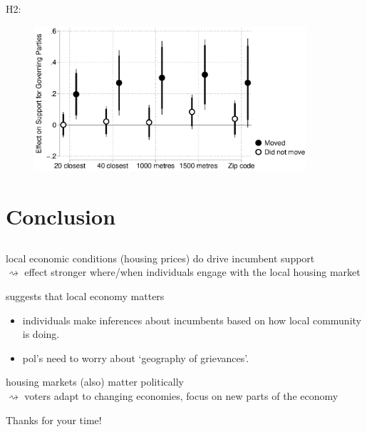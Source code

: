 \documentclass[10pt,aspectratio=169]{beamer}
\begin{document}

\begin{frame}
H2: \\ 
\centering
\begin{figure}[htbp!]
	\includegraphics[width=0.9\textwidth]{../../figures/moving.eps}
\end{figure}
\end{frame}



\section{Conclusion}
\subsection{}
\begin{frame}
local economic conditions (housing prices) do drive incumbent support \\ \pause
$\rightsquigarrow$ effect stronger where/when individuals engage with the local housing market \pause

\vspace{0.2in}
suggests that local economy matters \pause
\begin{itemize}[<+->]
\item individuals make inferences about incumbents based on how local community is doing.
\item pol's need to worry about `geography of grievances'.
\end{itemize}

\vspace{0.2in} \pause
housing markets (also) matter politically \\ \pause
$\rightsquigarrow$ voters adapt to changing economies, focus on new parts of the economy
\end{frame}

\begin{frame}
\centering
Thanks for your time!
\end{frame}

\appendix

	
\end{document}
